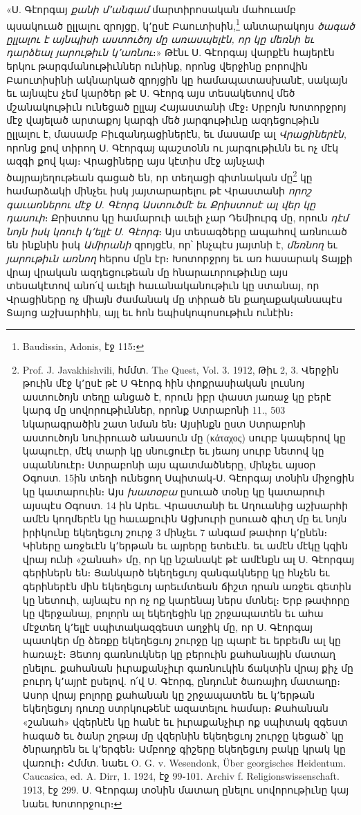 \documentclass{article}
\begin{document}
{«Ս. Գէորգայ \emph{քանի մ՚անգամ} մարտիրոսական մահուամբ պսակուած ըլլալու զրոյցը, կ՚ըսէ Բաուտիսին,\footnote{Baudissin, Adonis, էջ 115։} անտարակոյս \emph{ծագած ըլլալու է այնպիսի աստուծոյ մը առասպելէն, որ կը մեռնի եւ դարձեալ յարութիւն կ՚առնու}։» Թէնւ Ս. Գէորգայ վարքէն հայերէն երկու թարգմանութիւններ ունինք, որոնց վերջինը բորովին Բաուտիսինի ակնարկած զրոյցին կը համապատասխանէ, սակայն եւ այնպէս չեմ կարծեր թէ Ս. Գէորգ այս տեսակետով մեծ մշանակութիւն ունեցած ըլլայ Հայաստանի մէջ։ Սրբոյն Խոտորջրոյ մէջ վայելած արտաքոյ կարգի մեծ յարգութիւնը ազդեցութիւն ըլլալու է, մասամբ Բիւզանդացիներէն, եւ մասամբ ալ \emph{Վրացիներէն}, որոնց քով տիրող Ս. Գէորգայ պաշտօնն ու յարգութիւնն եւ ոչ մէկ ազգի քով կայ։ Վրացիները այս կէտիս մէջ այնչափ ծայրայեղութեան գացած են, որ տեղացի գիտնական մը\footnote{Prof. J. Javakhishvili, հմմտ. The Quest, Vol. 3. 1912, Թիւ 2, 3. Վերջին թուին մէջ կ՚ըսէ թէ Ս Գէորգ հին փոքրասիական լուսնոյ աստուծոյն տեղը անցած է, որուն իբր փաստ յառաջ կը բերէ կարգ մը սովորութիւններ, որոնք Ստրաբոնի 11., 503 նկարագրածին շատ նման են։ Այսինքն ըստ Ստրաբոնի աստուծոյն նուիրուած անասուն մը (κάταχος) սուրբ կապերով կը կապուէր, մէկ տարի կը սնուցուէր եւ յեաոյ սուրբ նետով կը սպաննուէր։ Ստրաբոնի այս պատմածները, մինչեւ այսօր Օգոստ. 15ին տեղի ունեցող Սպիտակ֊Ս. Գէորգայ տօնին միջոցին կը կատարուին։ Այս \emph{խատօբա} ըսուած տօնը կը կատարուի այսպէս Օգոստ. 14 ին Արեւ. Վրաստանի եւ Աղուանից աշխարհի ամէն կողմերէն կը հաւաքուին Ացխուրի ըսուած գիւղ մը եւ նոյն իրիկունը եկեղեցւոյ շուրջ 3 մինչեւ 7 անգամ թափոր կ՚ընեն։ Կիները առջեւէն կ՚երթան եւ այրերը ետեւէն. եւ ամէն մէկը կզին վրայ ունի «շանահ» մը, որ կը նշանակէ թէ ամէնքն ալ Ս. Գէորգայ գերիներն են։ Յանկարծ եկեղեցւոյ զանգակները կը հնչեն եւ գերիներէն մին եկեղեցւոյ արեւմտեան ճիշտ դրան առջեւ գետին կը նետուի, այնպէս որ ոչ ոք կարենայ ներս մտնել։ Երբ թափորը կը վերջանայ, բոլորն ալ եկեղեցին կը շրջապատեն եւ ահա մէջտեղ կ՚ելլէ սպիտակազգեստ աղջիկ մը, որ Ս. Գէորգայ պատկեր մը ձեռքը եկեղեցւոյ շուրջը կը պարէ եւ երբեմն ալ կը հառաչէ։ Յետոյ գառնուկներ կը բերուին քահանային մատաղ ընելու. քահանան իւրաքանչիւր գառնուկին ճակտին վրայ քիչ մը բուրդ կ՚այրէ ըսելով. ո՛վ Ս. Գէորգ, ընդունէ ծառայիդ մատաղը։ Ասոր վրայ բոլորը քահանան կը շրջապատեն եւ կ՚երթան եկեղեցւոյ դուռը ստրկութենէ ազատելու համար։ Քահանան «շանահ» վզերնէն կը հանէ եւ իւրաքանչիւր ոք սպիտակ զգեստ հագած եւ ծանր շղթայ մը վզերնին եկեղեցւոյ շուրջը կեցած՝ կը ծնրադրեն եւ կ՚երգեն։ Ամբողջ գիշերը եկեղեցւոյ բակը կրակ կը վառուի։ Հմմտ. նաեւ O. G. v. Wesendonk, Über georgisches Heidentum. Caucasica, ed. A. Dirr, 1. 1924, էջ 99֊101. Archiv f. Religionswissenschaft. 1913, էջ 299. Ս. Գէորգայ տօնին մատաղ ընելու սովորութիւնը կայ նաեւ Խոտորջուր։} կը համարձակի մինչեւ իսկ յայտարարելու թէ Վրաստանի \emph{որոշ գաւառներու մէջ Ս. Գէորգ Աստուծմէ եւ Քրիստոսէ ալ վեր կը դասուի}։ Քրիստոս կը համարուի աւելի չար Դեմիուրգ մը, որուն \emph{դէմ նոյն իսկ կռուի կ՚ելլէ Ս. Գէորգ}։ Այս տեսագծերը ապահով առնուած են ինքնին իսկ \emph{Ամիրանի} զրոյցէն, որ՝ ինչպէս յայտնի է, \emph{մեռնող} եւ \emph{յարութիւն առնող} հերոս մըն էր։ Խոտորջրոյ եւ առ հասարակ Տայքի վրայ վրական ազդեցութեան մը հնարաւորութիւնը այս տեսակէտով անո՛վ աւելի հաւանականութիւն կը ստանայ, որ Վրացիները ոչ միայն ժամանակ մը տիրած են քաղաքականապէս Տայոց աշխարհին, այլ եւ հոն եպիսկոպոսութիւն ունէին։

}
\end{document}
